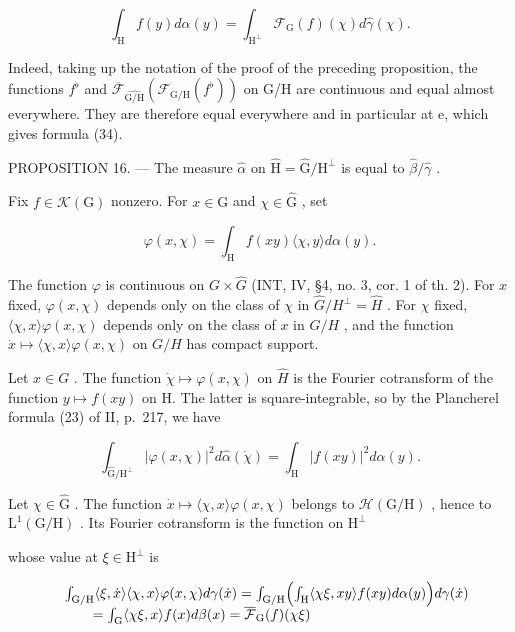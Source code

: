 \[
\int_ {\mathrm{H}} f (y) d \alpha (y) = \int_ {\mathrm{H} ^ {\perp}} \mathcal {F} _ {\mathrm{G}} (f) (\chi) d \widehat {\gamma} (\chi).\tag{34}
\]

Indeed, taking up the notation of the proof of the preceding proposition, the functions \(f^{\flat}\) and \(\overline{\mathcal{F}}_{\widehat{\mathrm{G/H}}}\left(\mathcal{F}_{\mathrm{G/H}}(f^{\flat})\right)\) on G/H are continuous and equal almost everywhere. They are therefore equal everywhere and in particular at e, which gives formula (34).

PROPOSITION 16. --- The measure \(\widehat{\alpha}\) on \(\widehat{\mathrm{H}} = \widehat{\mathrm{G}} / \mathrm{H}^{\perp}\) is equal to \(\widehat{\beta} / \widehat{\gamma}\) .

Fix \(f\in \mathcal{K}(\mathrm{G})\) nonzero. For \(x\in \mathrm{G}\) and \(\chi \in \widehat{\mathrm{G}}\) , set

\[
\varphi (x, \chi) = \int_ {\mathrm{H}} f (x y) \langle \chi , y \rangle d \alpha (y).
\]

The function \(\varphi\) is continuous on \(G \times \widehat{G}\) (INT, IV, §4, no. 3, cor. 1 of th. 2). For \(x\) fixed, \(\varphi(x, \chi)\) depends only on the class of \(\chi\) in \(\widehat{G}/H^{\perp} = \widehat{H}\) . For \(\chi\) fixed, \(\langle \chi, x \rangle \varphi(x, \chi)\) depends only on the class of \(x\) in \(G/H\) , and the function \(\dot{x} \mapsto \langle \chi, x \rangle \varphi(x, \chi)\) on \(G/H\) has compact support.

Let \(x \in G\) . The function \(\dot{\chi} \mapsto \varphi(x, \chi)\) on \(\hat{H}\) is the Fourier cotransform of the function \(y \mapsto f(xy)\) on H. The latter is square-integrable, so by the Plancherel formula (23) of II, p.~217, we have

\[
\int_ {\widehat {\mathrm{G}} / \mathrm{H} ^ {\perp}} | \varphi (x, \chi) | ^ {2} d \widehat {\alpha} (\dot {\chi}) = \int_ {\mathrm{H}} | f (x y) | ^ {2} d \alpha (y).\tag{35}
\]

 Let \(\chi\in\widehat{\mathrm{G}}\) . The function \(\dot{x}\mapsto\langle\chi,x\rangle\varphi(x,\chi)\) belongs to \(\mathcal{H}(\mathrm{G}/\mathrm{H})\) , hence to \(\mathrm{L}^{1}(\mathrm{G}/\mathrm{H})\) . Its Fourier cotransform is the function on \(\mathrm{H}^{\perp}\)

whose value at \(\xi\in\mathrm{H}^{\perp}\) is

\[
\begin{array}{r l} & {\int_ {\mathrm{G/H}} \langle \xi , \dot {x} \rangle \langle \chi , x \rangle \varphi (x, \chi) d \gamma (\dot {x}) = \int_ {\mathrm{G/H}} \Bigl (\int_ {\mathrm{H}} \langle \chi \xi , x y \rangle f (x y) d \alpha (y) \Bigr) d \gamma (\dot {x})} \\ & {\qquad = \int_ {\mathrm{G}} \langle \chi \xi , x \rangle f (x) d \beta (x) = \overline {{\mathcal {F}}} _ {\mathrm{G}} (f) (\chi \xi)} \end{array}
\]

